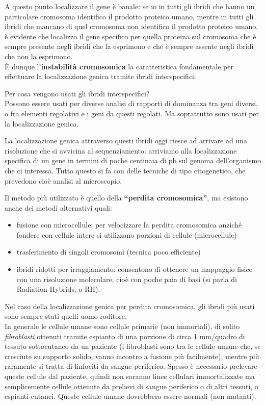 \documentclass[11pt]{book}
\begin{document}
A questo punto localizzare il gene è banale: se io in tutti gli ibridi che hanno un particolare cromosoma identifico il prodotto proteico umano, mentre in tutti gli ibridi che mancano di quel cromosoma non identifico il prodotto proteico umano, è evidente che localizzo il gene specifico per quella proteina sul cromosoma che è sempre presente negli ibridi che la esprimono e che è sempre assente negli ibridi che non la esprimono.\\
È dunque l’\textbf{instabilità cromosomica} la caratteristica fondamentale per effettuare la localizzazione genica tramite ibridi interspecifici.

Per cosa vengono usati gli ibridi interspecifici?\\
Possono essere usati per diverse analisi di rapporti di dominanza tra geni diversi, o fra elementi regolativi e i geni da questi regolati. Ma soprattutto sono usati per la localizzazione genica.

La localizzazione genica attraverso questi ibridi oggi riesce ad arrivare ad una risoluzione che si avvicina al sequenziamento: arriviamo alla localizzazione specifica di un gene in termini di poche centinaia di pb sul genoma dell’organismo che ci interessa. Tutto questo si fa con delle tecniche di tipo citogenetico, che prevedono cioè analisi al microscopio.

Il metodo più utilizzato è quello della \textbf{``perdita cromosomica''}, ma esistono anche dei metodi alternativi quali:
\begin{itemize}
\item fusione con microcellule: per velocizzare la perdita cromosomica anziché fondere con cellule intere si utilizzano porzioni di cellule (microcellule)
\item trasferimento di singoli cromosomi (tecnica poco efficiente)
\item ibridi ridotti per irraggiamento: consentono di ottenere un mappaggio fisico con una risoluzione molecolare, cioè con poche paia di basi (si parla di Radiation Hybrids, o RH).
\end{itemize}

Nel caso della localizzazione genica per perdita cromosomica, gli ibridi più usati sono sempre stati quelli uomo-roditore.\\
In generale le cellule umane sono cellule primarie (non immortali), di solito \emph{fibroblasti} ottenuti tramite espianto di una porzione di circa 1 mm/quadro di tessuto sottocutaneo da un paziente (i fibroblasti sono tra le cellule umane che, se cresciute su supporto solido, vanno incontro a fusione più facilmente), mentre più raramente si tratta di linfociti da sangue periferico. Spesso è necessario prelevare queste cellule dal paziente, quindi non saranno linee cellulari immortalizzate ma semplicemente cellule ottenute da prelievi di sangue periferico o di altri tessuti, o espianti cutanei. 
Queste cellule umane dovrebbero essere normali (non mutanti).
\end{document}

